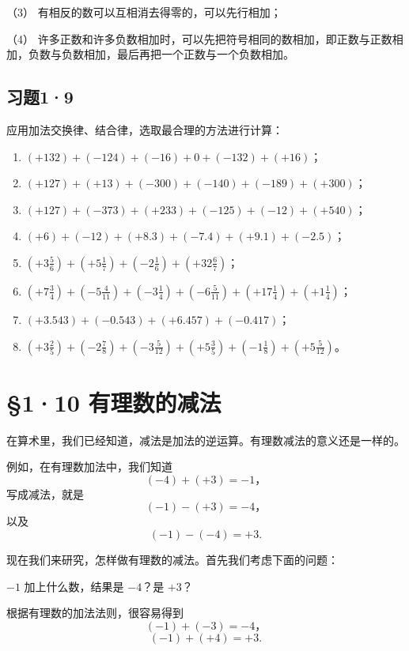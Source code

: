 （3） 有相反的数可以互相消去得零的，可以先行相加；

（4） 许多正数和许多负数相加时，可以先把符号相同的数相加，即正数与正数相加，负数与负数相加，最后再把一个正数与一个负数相加。

\subsection{习题1·9}

应用加法交换律、结合律，选取最合理的方法进行计算：

\begin{enumerate}
\item \((+132) + (-124) + (-16) + 0 + (-132) + (+16)\)；
\item \((+127) + (+13) + (-300) + (-140) + (-189) + (+300)\)；
\item \((+127) + (-373) + (+233) + (-125) + (-12) + (+540)\)；
\item \((+6) + (-12) + (+8.3) + (-7.4) + (+9.1) + (-2.5)\)；
\item \(\left(+3\frac{5}{6}\right) + \left(+5\frac{1}{7}\right) + \left(-2\frac{1}{6}\right) + \left(+32\frac{6}{7}\right)\)；
\item \(\left(+7\frac{3}{4}\right) + \left(-5\frac{4}{11}\right) + \left(-3\frac{1}{4}\right) + \left(-6\frac{5}{11}\right) + \left(+17\frac{1}{4}\right) + \left(+1\frac{1}{4}\right)\)；
\item \((+3.543) + (-0.543) + (+6.457) + (-0.417)\)；
\item \(\left(+3\frac{2}{5}\right) + \left(-2\frac{7}{8}\right) + \left(-3\frac{5}{12}\right) + \left(+5\frac{3}{5}\right) + \left(-1\frac{1}{8}\right) + \left(+5\frac{5}{12}\right)\)。
\end{enumerate}

\section{§1·10 有理数的减法}

在算术里，我们已经知道，减法是加法的逆运算。有理数减法的意义还是一样的。

例如，在有理数加法中，我们知道
\[
(-4) + (+3) = -1， \tag{1}
\]
写成减法，就是
\[
(-1) - (+3) = -4， \tag{2}
\]
以及
\[
(-1) - (-4) = +3. \tag{3}
\]

现在我们来研究，怎样做有理数的减法。首先我们考虑下面的问题：

$-1$ 加上什么数，结果是 $-4$？是 $+3$？

根据有理数的加法法则，很容易得到
\[
(-1) + (-3) = -4， \tag{4}
\]
\[
(-1) + (+4) = +3. \tag{5}
\]

